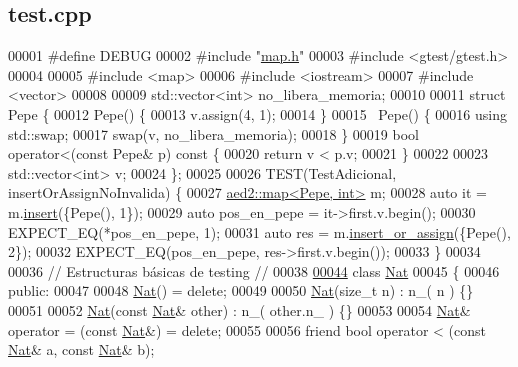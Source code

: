 \hypertarget{test_8cpp_source}{}\subsection{test.\+cpp}

\begin{DoxyCode}
00001 \textcolor{preprocessor}{#define DEBUG}
00002 \textcolor{preprocessor}{#include "\hyperlink{map_8h}{map.h}"}
00003 \textcolor{preprocessor}{#include <gtest/gtest.h>}
00004 
00005 \textcolor{preprocessor}{#include <map>}
00006 \textcolor{preprocessor}{#include <iostream>}
00007 \textcolor{preprocessor}{#include <vector>}
00008 
00009 std::vector<int> no\_libera\_memoria;
00010 
00011 \textcolor{keyword}{struct }Pepe \{
00012     Pepe() \{
00013         v.assign(4, 1);
00014     \}
00015     ~Pepe() \{
00016         \textcolor{keyword}{using} std::swap;
00017         swap(v, no\_libera\_memoria);
00018     \}
00019     \textcolor{keywordtype}{bool} operator<(\textcolor{keyword}{const} Pepe& p)\textcolor{keyword}{ const }\{
00020         \textcolor{keywordflow}{return} v < p.v;
00021     \}
00022     
00023     std::vector<int> v;
00024 \};
00025 
00026 TEST(TestAdicional, insertOrAssignNoInvalida) \{
00027     \hyperlink{classaed2_1_1map}{aed2::map<Pepe, int>} m;
00028     \textcolor{keyword}{auto} it = m.\hyperlink{classaed2_1_1map_a60aacba06b1579630b3c8e996cf248c8_a60aacba06b1579630b3c8e996cf248c8}{insert}(\{Pepe(), 1\});
00029     \textcolor{keyword}{auto} pos\_en\_pepe = it->first.v.begin();
00030     EXPECT\_EQ(*pos\_en\_pepe, 1);
00031     \textcolor{keyword}{auto} res = m.\hyperlink{classaed2_1_1map_a2ef6723c183916276b0afc4a4c721475_a2ef6723c183916276b0afc4a4c721475}{insert\_or\_assign}(\{Pepe(), 2\});
00032     EXPECT\_EQ(pos\_en\_pepe, res->first.v.begin());
00033 \}
00034 
00036 \textcolor{comment}{// Estructuras básicas de testing //}
00038 \textcolor{comment}{}
\hyperlink{classNat}{00044} \textcolor{keyword}{class }\hyperlink{classNat}{Nat}
00045 \{
00046     \textcolor{keyword}{public}:
00047 
00048         \hyperlink{classNat}{Nat}() = \textcolor{keyword}{delete};
00049 
00050         \hyperlink{classNat}{Nat}(\textcolor{keywordtype}{size\_t} n) : n\_( n ) \{\}
00051 
00052         \hyperlink{classNat}{Nat}(\textcolor{keyword}{const} \hyperlink{classNat}{Nat}& other) : n\_( other.n\_ ) \{\}
00053 
00054         \hyperlink{classNat}{Nat}& operator = (\textcolor{keyword}{const} \hyperlink{classNat}{Nat}&) = \textcolor{keyword}{delete};
00055 
00056         \textcolor{keyword}{friend} \textcolor{keywordtype}{bool} operator < (\textcolor{keyword}{const} \hyperlink{classNat}{Nat}& a, \textcolor{keyword}{const} \hyperlink{classNat}{Nat}& b);

\end{DoxyCode}
